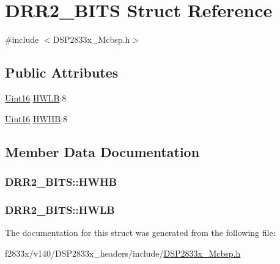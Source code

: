 \hypertarget{struct_d_r_r2___b_i_t_s}{}\section{D\+R\+R2\+\_\+\+B\+I\+T\+S Struct Reference}
\label{struct_d_r_r2___b_i_t_s}


{\ttfamily \#include $<$D\+S\+P2833x\+\_\+\+Mcbsp.\+h$>$}

\subsection*{Public Attributes}
\begin{DoxyCompactItemize}
\item 
\hyperlink{_d_s_p2833x___device_8h_a59a9f6be4562c327cbfb4f7e8e18f08b}{Uint16} \hyperlink{struct_d_r_r2___b_i_t_s_ad51ef6be98e9de8063a70abce874f6cd}{H\+W\+L\+B}\+:8
\item 
\hyperlink{_d_s_p2833x___device_8h_a59a9f6be4562c327cbfb4f7e8e18f08b}{Uint16} \hyperlink{struct_d_r_r2___b_i_t_s_a54657429cbaf29936d6f0f4d7fa2e39a}{H\+W\+H\+B}\+:8
\end{DoxyCompactItemize}


\subsection{Member Data Documentation}
\hypertarget{struct_d_r_r2___b_i_t_s_a54657429cbaf29936d6f0f4d7fa2e39a}{}
\subsubsection[{H\+W\+H\+B}]{ D\+R\+R2\+\_\+\+B\+I\+T\+S\+::\+H\+W\+H\+B}\label{struct_d_r_r2___b_i_t_s_a54657429cbaf29936d6f0f4d7fa2e39a}
\hypertarget{struct_d_r_r2___b_i_t_s_ad51ef6be98e9de8063a70abce874f6cd}{}
\subsubsection[{H\+W\+L\+B}]{ D\+R\+R2\+\_\+\+B\+I\+T\+S\+::\+H\+W\+L\+B}\label{struct_d_r_r2___b_i_t_s_ad51ef6be98e9de8063a70abce874f6cd}


The documentation for this struct was generated from the following file\+:\begin{DoxyCompactItemize}
\item 
f2833x/v140/\+D\+S\+P2833x\+\_\+headers/include/\hyperlink{_d_s_p2833x___mcbsp_8h}{D\+S\+P2833x\+\_\+\+Mcbsp.\+h}\end{DoxyCompactItemize}
